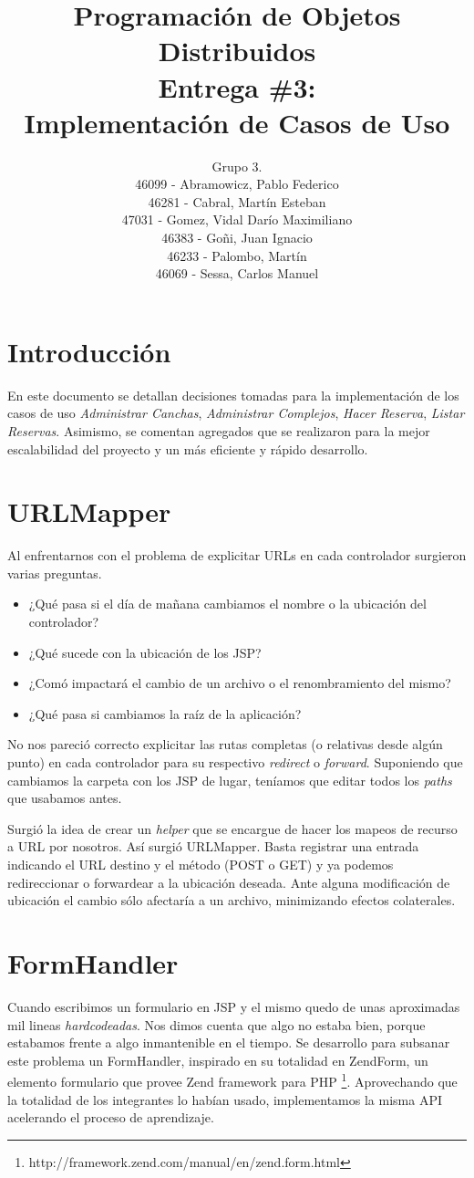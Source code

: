 \documentclass[a4paper,11pt]{article}
\title{
        Programación de Objetos Distribuidos \\
        Entrega \#3: \\
        Implementación de Casos de Uso
    }
\author{
        Grupo 3. \\
        46099 - Abramowicz, Pablo Federico \\
        46281 - Cabral, Martín Esteban \\
        47031 - Gomez, Vidal Darío Maximiliano \\
        46383 - Goñi, Juan Ignacio \\
        46233 - Palombo, Martín \\
        46069 - Sessa, Carlos Manuel
        }
\date{}
\begin{document}
\maketitle
\pagebreak

\section{Introducción}
En este documento se detallan decisiones tomadas para la implementación de los
casos de uso \emph{Administrar Canchas}, \emph{Administrar Complejos},
\emph{Hacer Reserva}, \emph{Listar Reservas}. Asimismo, se comentan agregados
que se realizaron para la mejor escalabilidad del proyecto y un más eficiente y
rápido desarrollo.

\section{URLMapper}
Al enfrentarnos con el problema de explicitar URLs en cada controlador
surgieron varias preguntas.
\begin{itemize}
 \item ¿Qué pasa si el día de mañana cambiamos el nombre o la ubicación
del controlador?
 \item ¿Qué sucede con la ubicación de los JSP?
 \item ¿Comó impactará el cambio de un archivo o el renombramiento del mismo?
 \item ¿Qué pasa si cambiamos la raíz de la aplicación?
\end{itemize}

No nos pareció correcto explicitar las rutas completas (o relativas desde
algún punto) en cada controlador para su respectivo \emph{redirect} o
\emph{forward}. Suponiendo que cambiamos la carpeta con los JSP de
lugar, teníamos que editar todos los \emph{paths} que usabamos antes.

Surgió la idea de crear un \emph{helper} que se encargue de hacer los
mapeos de recurso a URL por nosotros. Así surgió URLMapper.
Basta registrar una entrada indicando el URL destino y el método
(POST o GET) y ya podemos redireccionar o forwardear a la ubicación
deseada. Ante alguna modificación de ubicación el cambio sólo afectaría
a un archivo, minimizando efectos colaterales.

\section{FormHandler}
Cuando escribimos un formulario en JSP y el mismo quedo de unas aproximadas
mil lineas \emph{hardcodeadas}. Nos dimos cuenta que algo no estaba bien,
porque estabamos frente a algo inmantenible en el tiempo.
Se desarrollo para subsanar este problema un FormHandler, inspirado en su
totalidad en ZendForm, un elemento formulario que provee Zend framework
para PHP \footnote{http://framework.zend.com/manual/en/zend.form.html}.
Aprovechando que la totalidad de los integrantes lo habían usado,
implementamos la misma API acelerando el proceso de aprendizaje.
\end{document}
